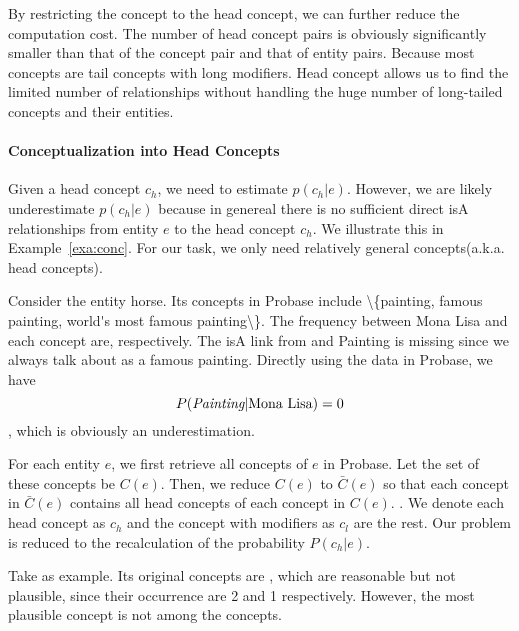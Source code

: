 By restricting the concept to the head concept, we can further reduce the computation cost.
The number of head concept pairs is obviously significantly smaller than that of the concept pair and that of entity pairs. Because most concepts are tail concepts with long modifiers. Head concept allows us to find the limited number of relationships without handling the huge number of long-tailed concepts and their entities.

\paragraph{Conceptualization into Head Concepts}

Given a head concept $c_h$, we need to estimate $p(c_h|e)$. However, we are likely underestimate $p(c_h|e)$ because in genereal there is no sufficient direct isA relationships from entity $e$ to the head concept $c_h$. We illustrate this in Example~\ref{exa:conc}. For our task, we only need relatively general concepts(a.k.a. head concepts).
\begin{example}
\label{exa:conc}
Consider the entity \ac{horse}. Its concepts in Probase include \ac{\{painting, famous painting, world's most famous painting\}}. The frequency between \ac{Mona Lisa} and each concept are, respectively. The isA link from  and \ac{Painting} is missing since we always talk about  as a famous painting. Directly using the data in Probase, we have $$P(\emph{Painting}|{\tt \text{Mona Lisa}})=0$$, which is obviously an underestimation.
\end{example}


For each entity $e$, we first retrieve all concepts of $e$ in Probase. Let the set of these concepts be $C(e)$. Then, we reduce $C(e)$ to $\bar{C}(e)$ so that each concept in $\bar{C}(e)$ contains all head concepts of each concept in $C(e)$. . We denote each head concept as $c_h$ and the concept with modifiers as $c_{l}$ are the rest. Our problem is reduced to the recalculation of the probability $P({c_h}|e)$.



\begin{example}
\label{exa:HvsO}
Take  as example. Its original concepts are , which are reasonable but not plausible, since their occurrence are 2 and 1 respectively. However, the most plausible concept  is not among the concepts.
\end{example}


